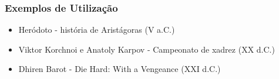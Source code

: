 \documentclass{beamer}
\begin{document}

\begin{frame}
\frametitle{Exemplos de Utilização}
\begin{itemize}
\item Heródoto - história de Aristágoras (V a.C.)\newline
\item Viktor Korchnoi e Anatoly Karpov - Campeonato de xadrez (XX d.C.)\newline
\item Dhiren Barot - Die Hard: With a Vengeance (XXI d.C.)\newline
\end{itemize}
\end{frame}


\end{document}
